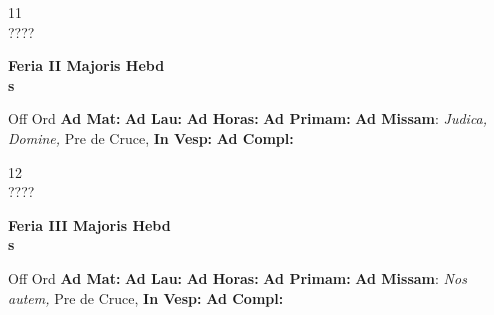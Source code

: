 \documentclass[10pt, openany]{book}
\begin{document}
    \begin{center}
        \begin{minipage}{3.5in}
            \vspace{2em}
            \begin{minipage}{0.5in}
                {\Huge 11} \\
                {\normalsize ????}
            \end{minipage}
            \begin{minipage}{3.0in}
                \textbf{ \large Feria II Majoris Hebd \\
                \textnormal{\normalsize s}}

            \end{minipage}
            \begin{justify}Off Ord
                \textbf{Ad Mat: }
                \textbf{Ad Lau: }
                \textbf{Ad Horas: }
                \textbf{Ad Primam: }\textbf{Ad Missam}: \textit{Judica, Domine,} Pre de Cruce, 
                \textbf{In Vesp: }
                \textbf{Ad Compl: }
            \end{justify}
        \end{minipage}
    \end{center}

    \begin{center}
        \begin{minipage}{3.5in}
            \vspace{2em}
            \begin{minipage}{0.5in}
                {\Huge 12} \\
                {\normalsize ????}
            \end{minipage}
            \begin{minipage}{3.0in}
                \textbf{ \large Feria III Majoris Hebd \\
                \textnormal{\normalsize s}}

            \end{minipage}
            \begin{justify}Off Ord
                \textbf{Ad Mat: }
                \textbf{Ad Lau: }
                \textbf{Ad Horas: }
                \textbf{Ad Primam: }\textbf{Ad Missam}: \textit{Nos autem,} Pre de Cruce, 
                \textbf{In Vesp: }
                \textbf{Ad Compl: }
            \end{justify}
        \end{minipage}
    \end{center}
\end{document}
